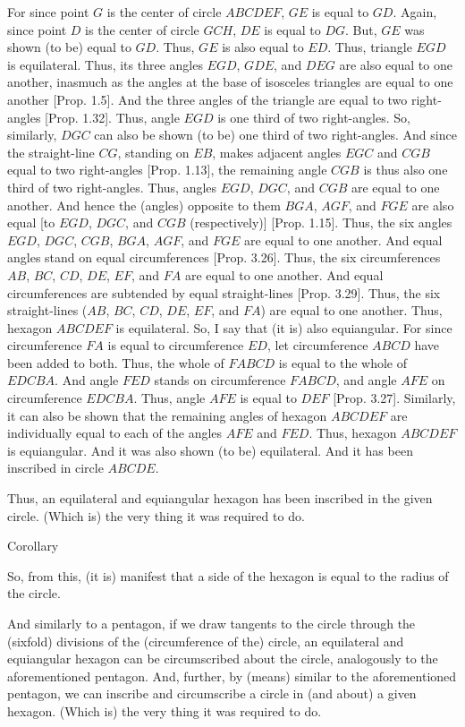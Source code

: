 \begin{Parallel}{}{}
{For since point $G$ is the center of circle $ABCDEF$, $GE$ is equal to $GD$.
Again, since point $D$ is the center of circle $GCH$, $DE$ is equal to
$DG$. But, $GE$ was shown (to be) equal to $GD$. Thus, $GE$ is also equal to
$ED$. Thus, triangle $EGD$ is equilateral. Thus, its three angles
$EGD$, $GDE$, and $DEG$ are also equal to one another, inasmuch as the angles at the base of 
 isosceles triangles are equal to one another [Prop. 1.5]. And the three angles of the
 triangle are equal to
 two right-angles [Prop. 1.32].
 Thus, angle $EGD$ is one third of two right-angles. So, similarly,
  $DGC$ can also be shown (to be) one third of two right-angles.
   And since the straight-line $CG$, standing on $EB$, makes 
 adjacent angles $EGC$ and $CGB$ equal to two right-angles [Prop. 1.13], the remaining angle
 $CGB$ is thus also one third of two right-angles.
 Thus, angles $EGD$, $DGC$, and $CGB$ are equal to one another.
 And hence the (angles) opposite to them $BGA$, $AGF$, and $FGE$
 are also equal [to $EGD$, $DGC$, and $CGB$ (respectively)] [Prop. 1.15]. Thus,
 the six angles $EGD$, $DGC$, $CGB$, $BGA$, $AGF$, and $FGE$ are equal to one
 another. And equal angles stand on equal circumferences [Prop. 3.26]. Thus, the six circumferences
 $AB$, $BC$, $CD$, $DE$, $EF$, and $FA$ are equal to one another. And
  equal circumferences
  are subtended by equal straight-lines [Prop. 3.29]. Thus, the six
 straight-lines ($AB$, $BC$, $CD$, $DE$, $EF$, and $FA$) are equal to one another.
 Thus, hexagon $ABCDEF$ is equilateral. 
 So, I say that (it is) also equiangular. For since circumference $FA$
 is equal to circumference $ED$, let circumference $ABCD$ have been added
 to both. Thus, the whole of $FABCD$ is equal to the whole of
 $EDCBA$. And angle $FED$ stands on circumference $FABCD$,
 and angle $AFE$ on circumference $EDCBA$. Thus, angle
 $AFE$ is equal to $DEF$ [Prop. 3.27].
 Similarly, it can also be shown that the remaining angles of hexagon
 $ABCDEF$ are individually equal to each of the angles $AFE$ and $FED$.
 Thus, hexagon $ABCDEF$ is equiangular. And it was also shown (to be)
 equilateral. And it has been inscribed in circle $ABCDE$.
 
 Thus, an equilateral and equiangular hexagon has been inscribed
 in the given circle. (Which is) the very thing it was required to do.\\
 
 \begin{center}
{\large Corollary}
\end{center}\vspace*{-7pt}

So, from this, (it is) manifest that a side of the hexagon is equal
to the radius of the circle.

And similarly to  a pentagon, if we draw  tangents to the circle through
the (sixfold) divisions of the (circumference of the) circle, an equilateral and equiangular hexagon
can be circumscribed about the circle, analogously to the aforementioned pentagon. And, further, by (means) similar to the aforementioned pentagon,
we can inscribe and circumscribe a circle in (and about) a given hexagon. 
(Which
is) the very thing it was required to do.}
\end{Parallel}


